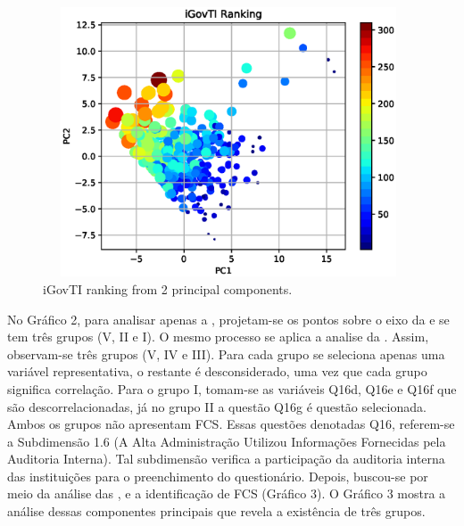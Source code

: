 \begin{figure}[h!]
     \centering 
     \includegraphics[height=8cm, width=11cm]{figures/ch2/raw_igovti_ranking_pc2.eps}
     \caption{iGovTI ranking from 2 principal components.}
     \label{fig:ch2_fig3}
\end{figure}

No Gráfico 2, para analisar apenas a , projetam-se os pontos sobre o eixo da e se tem três grupos (V, II e I). O mesmo processo se aplica a analise da . Assim, observam-se três grupos (V, IV e III). Para cada grupo se seleciona apenas uma variável representativa, o restante é desconsiderado, uma vez que cada grupo significa correlação.
Para o grupo I, tomam-se as variáveis Q16d, Q16e e Q16f que são descorrelacionadas, já no grupo II a questão Q16g é questão selecionada. Ambos os grupos não apresentam FCS. Essas questões denotadas Q16, referem-se a Subdimensão 1.6 (A Alta Administração Utilizou Informações Fornecidas pela Auditoria Interna). Tal subdimensão verifica a participação da auditoria interna das instituições para o preenchimento do questionário. 
Depois, buscou-se por meio da análise das ,  e a identificação de FCS (Gráfico 3). O Gráfico 3 mostra a análise dessas componentes principais que revela a existência de três grupos. 

